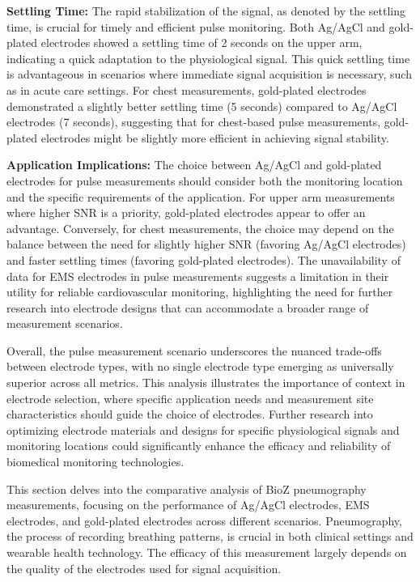 \documentclass[conference]{IEEEtran}
\begin{document}
\textbf{Settling Time:} The rapid stabilization of the signal, as denoted by the settling time, is crucial for timely and efficient pulse monitoring. Both Ag/AgCl and gold-plated electrodes showed a settling time of 2 seconds on the upper arm, indicating a quick adaptation to the physiological signal. This quick settling time is advantageous in scenarios where immediate signal acquisition is necessary, such as in acute care settings. For chest measurements, gold-plated electrodes demonstrated a slightly better settling time (5 seconds) compared to Ag/AgCl electrodes (7 seconds), suggesting that for chest-based pulse measurements, gold-plated electrodes might be slightly more efficient in achieving signal stability.

\textbf{Application Implications:} The choice between Ag/AgCl and gold-plated electrodes for pulse measurements should consider both the monitoring location and the specific requirements of the application. For upper arm measurements where higher SNR is a priority, gold-plated electrodes appear to offer an advantage. Conversely, for chest measurements, the choice may depend on the balance between the need for slightly higher SNR (favoring Ag/AgCl electrodes) and faster settling times (favoring gold-plated electrodes). The unavailability of data for EMS electrodes in pulse measurements suggests a limitation in their utility for reliable cardiovascular monitoring, highlighting the need for further research into electrode designs that can accommodate a broader range of measurement scenarios.


Overall, the pulse measurement scenario underscores the nuanced trade-offs between electrode types, with no single electrode type emerging as universally superior across all metrics. This analysis illustrates the importance of context in electrode selection, where specific application needs and measurement site characteristics should guide the choice of electrodes. Further research into optimizing electrode materials and designs for specific physiological signals and monitoring locations could significantly enhance the efficacy and reliability of biomedical monitoring technologies.

This section delves into the comparative analysis of BioZ pneumography measurements, focusing on the performance of Ag/AgCl electrodes, EMS electrodes, and gold-plated electrodes across different scenarios. Pneumography, the process of recording breathing patterns, is crucial in both clinical settings and wearable health technology. The efficacy of this measurement largely depends on the quality of the electrodes used for signal acquisition.
\end{document}
